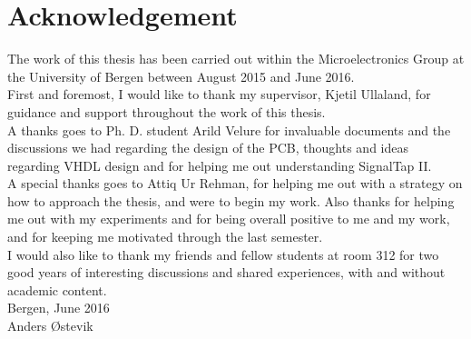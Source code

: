 \documentclass[main.tex]{subfiles}
\begin{document}
\chapter*{Acknowledgement}



{\setlength{\parindent}{0cm}
The work of this thesis has been carried out within the Microelectronics Group at the University of Bergen between August 2015 and June 2016.\\

First and foremost, I would like to thank my supervisor, Kjetil Ullaland, for guidance and support throughout the work of this thesis. \\

A thanks goes to Ph. D. student Arild Velure for invaluable documents and the discussions we had regarding the design of the PCB, thoughts and ideas regarding VHDL design and for helping me out understanding SignalTap II.\\

A special thanks goes to Attiq Ur Rehman, for helping me out with a strategy on how to approach the thesis, and were to begin my work. Also thanks for helping me out with my experiments and for being overall positive to me and my work, and for keeping me motivated through the last semester.\\

I would also like to thank my friends and fellow students at room 312 for two good years of interesting discussions and shared experiences, with and without academic content.\\



Bergen, June 2016 \\[1em]


Anders Østevik

}

\end{document}
